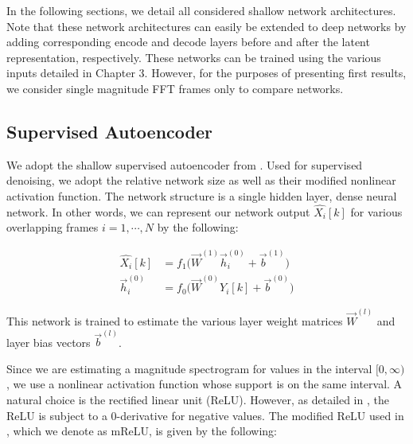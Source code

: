 In the following sections, we detail all considered shallow network architectures. Note that these network architectures can easily be extended to deep networks by adding corresponding encode and decode layers before and after the latent representation, respectively. These networks can be trained using the various inputs detailed in Chapter 3. However, for the purposes of presenting first results, we consider single magnitude FFT frames only to compare networks. %


\subsection{Supervised Autoencoder}

We adopt the shallow supervised autoencoder from \cite{liu2014experiments}. Used for supervised denoising, we adopt the relative network size as well as their modified nonlinear activation function. The network structure is a single hidden layer, dense neural network. In other words, we can represent our network output $\hat{X_i}[k]$ for various overlapping frames $i=1,\cdots,N$ by the following:


\begin{align}
\hat{X_i}[k] &= f_1 \big( \vec{W}^{(1)} \vec{h}_i^{(0)} + \vec{b}^{(1)} \big)\\
\vec{h}_i^{(0)} &= f_0 \big( \vec{W}^{(0)} Y_i[k] + \vec{b}^{(0)} \big)
\end{align}


This network is trained to estimate the various layer weight matrices $\vec{W}^{(l)}$ and layer bias vectors $\vec{b}^{(l)}$.

Since we are estimating a magnitude spectrogram for values in the interval $[0,\infty)$, we use a nonlinear activation function whose support is on the same interval. A natural choice is the rectified linear unit (ReLU). However, as detailed in \cite{liu2014experiments}, the ReLU is subject to a 0-derivative for negative values. The modified ReLU used in \cite{liu2014experiments}, which we denote as mReLU, is given by the following:

